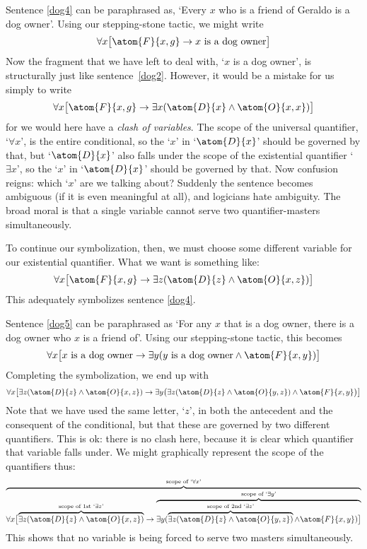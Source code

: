 Sentence \ref{dog4} can be paraphrased as, `Every $x$ who is a friend of Geraldo is a dog owner'. Using our stepping-stone tactic, we might write 
$$\forall x \bigl[\atom{F}{x,g} \eif x \text{ is a dog owner}\bigr]$$
Now the fragment that we have left to deal with, `$x$ is a dog owner', is structurally just like sentence~\ref{dog2}. However, it would be a mistake for us simply to write 
$$\forall x \bigl[\atom{F}{x,g} \eif \exists x(\atom{D}{x} \eand \atom{O}{x,x})\bigr]$$
for we would here have a \emph{clash of variables}. The scope of the universal quantifier, `$\forall x$', is the entire conditional, so the `$x$' in `$\atom{D}{x}$' should be governed by that, but `$\atom{D}{x}$' also falls under the scope of the existential quantifier `$\exists x$', so the `$x$' in `$\atom{D}{x}$' should be governed by that. Now confusion reigns: which `$x$' are we talking about? Suddenly the sentence becomes ambiguous (if it is even meaningful at all), and logicians hate ambiguity. The broad moral is that a single variable cannot serve two quantifier-masters simultaneously.

To continue our symbolization, then, we must choose some different variable for our existential quantifier. What we want is something like:
$$\forall x\bigl[\atom{F}{x,g} \eif\exists z(\atom{D}{z} \eand \atom{O}{x,z})\bigr]$$
This adequately symbolizes sentence \ref{dog4}.

Sentence \ref{dog5} can be paraphrased as `For any $x$ that is a dog owner, there is a dog owner who $x$ is a friend of'. Using our stepping-stone tactic, this becomes 
$$\forall x\bigl[\mbox{$x$ is a dog owner}\eif\exists y(\mbox{$y$ is a dog owner}\eand \atom{F}{x,y})\bigr]$$
Completing the symbolization, we end up with
$$\forall x\bigl[\exists z(\atom{D}{z} \eand \atom{O}{x,z})\eif\exists y\bigl(\exists z(\atom{D}{z} \eand \atom{O}{y,z})\eand \atom{F}{x,y}\bigr)\bigr]$$
Note that we have used the same letter, `$z$', in both the antecedent and the consequent of the conditional, but that these are governed by two different quantifiers. This is ok: there is no clash here, because it is clear which quantifier that variable falls under. We might graphically represent the scope of the quantifiers thus:
$$\overbrace{\forall x\bigl[\overbrace{\exists z(\atom{D}{z} \eand \atom{O}{x,z})}^{\text{scope of 1st `}\exists z\text{'}}\eif \overbrace{\exists y(\overbrace{\exists z(\atom{D}{z} \eand \atom{O}{y,z})}^{\text{scope of 2nd `}\exists z\text{'}}\eand \atom{F}{x,y})\bigr]}^{\text{scope of `}\exists y\text{'}}}^{\text{scope of `}\forall x\text{'}}$$
This shows that no variable is being forced to serve two masters simultaneously.

